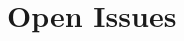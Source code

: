 \documentclass[onecolumn]{newsiambook}
\begin{document}
    \chapter{Open Issues} %
    





\renewcommand\partname{Back Matter}
\renewcommand\chaptername{Appendix}


\backmatter



\printindex
\end{document}
